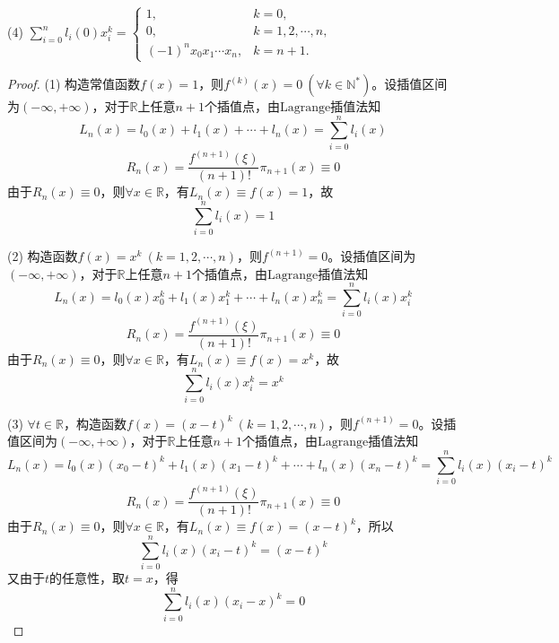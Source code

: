 \documentclass[12pt, a4paper, oneside]{ctexart}
\begin{document}
(4) $\sum\limits_{i=0}^nl_i(0)x_i^k=
\begin{cases}
    1,&k=0,\\0,&k=1,2,\cdots,n,\\(-1)^nx_0x_1\cdots x_n,&k=n+1.
\end{cases}$
\begin{proof}
    (1) 构造常值函数$f(x) = 1$，则$f^{(k)}(x)=0\ (\forall k\in\mathbb{N}^*)$。设插值区间为$(-\infty, +\infty)$，对于$\mathbb{R}$上任意$n+1$个插值点，由$\text{Lagrange插值法}$知
    \begin{equation*}
        L_n(x) = l_0(x)+l_1(x)+\cdots+l_n(x) = \sum_{i=0}^nl_i(x)
    \end{equation*}
    \begin{equation*}
        R_n(x) = \frac{f^{(n+1)}(\xi)}{(n+1)!}\pi_{n+1}(x)\equiv 0
    \end{equation*}
    由于$R_n(x)\equiv 0$，则$\forall x \in \mathbb{R}$，有$L_n(x) \equiv f(x) = 1$，故
    \begin{equation*}
        \sum_{i=0}^nl_i(x) = 1
    \end{equation*}

    (2) 构造函数$f(x)=  x^k\ (k = 1,2,\cdots, n)$，则$f^{(n+1)}=0$。设插值区间为$(-\infty, +\infty)$，对于$\mathbb{R}$上任意$n+1$个插值点，由$\text{Lagrange插值法}$知
    \begin{equation*}
        L_n(x) = l_0(x)x_0^k+l_1(x)x_1^k+\cdots+l_n(x)x_n^k=\sum_{i=0}^nl_i(x)x_i^k
    \end{equation*}
    \begin{equation*}
        R_n(x)=\frac{f^{(n+1)}(\xi)}{(n+1)!}\pi_{n+1}(x)\equiv 0
    \end{equation*}
    由于$R_n(x)\equiv 0$，则$\forall x \in \mathbb{R}$，有$L_n(x) \equiv f(x) = x^k$，故
    \begin{equation*}
        \sum_{i=0}^nl_i(x)x_i^k = x^k
    \end{equation*}

    (3) $\forall t\in\mathbb{R}$，构造函数$f(x)=  (x-t)^k\ (k = 1,2,\cdots, n)$，则$f^{(n+1)}=0$。设插值区间为$(-\infty, +\infty)$，对于$\mathbb{R}$上任意$n+1$个插值点，由$\text{Lagrange插值法}$知
    \begin{equation*}
        L_n(x) = l_0(x)(x_0-t)^k+l_1(x)(x_1-t)^k+\cdots+l_n(x)(x_n-t)^k=\sum_{i=0}^nl_i(x)(x_i-t)^k
    \end{equation*}
    \begin{equation*}
        R_n(x)=\frac{f^{(n+1)}(\xi)}{(n+1)!}\pi_{n+1}(x)\equiv 0
    \end{equation*}
    由于$R_n(x)\equiv 0$，则$\forall x \in \mathbb{R}$，有$L_n(x) \equiv f(x) = (x-t)^k$，所以
    \begin{equation*}
        \sum_{i=0}^nl_i(x)(x_i-t)^k = (x-t)^k
    \end{equation*}
    又由于$t$的任意性，取$t=x$，得
    \begin{equation*}
        \sum_{i=0}^nl_i(x)(x_i-x)^k = 0
    \end{equation*}


\end{proof}
\end{document}
